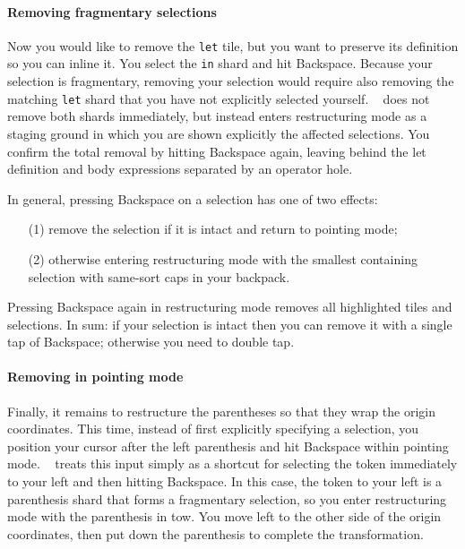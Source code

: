 \paragraph{Removing fragmentary selections}
Now you would like to remove the \texttt{let} tile,
but you want to preserve its definition so you
can inline it.
You select the \texttt{in} shard and hit Backspace.
Because your selection is fragmentary, removing
your selection would require also removing the
matching \texttt{let} shard that you have not
explicitly selected yourself.
\tylr~ does not remove both shards immediately, but
instead enters restructuring mode as a staging ground
in which you are shown explicitly the affected
selections.
You confirm the total removal by hitting Backspace again,
leaving behind the let definition and body expressions
separated by an operator hole.

In general, pressing Backspace on a selection
has one of two effects:
\begin{enumerate}
  \item[(1)] remove the selection if it is intact
    and return to pointing mode;
  \item[(2)] otherwise entering restructuring mode with
    the smallest containing selection with same-sort caps
    in your backpack.
\end{enumerate}
Pressing Backspace again in restructuring mode
removes all highlighted tiles and selections.
In sum: if your selection is intact then you can
remove it with a single tap of Backspace; otherwise
you need to double tap.



\paragraph{Removing in pointing mode}
Finally, it remains to restructure the parentheses
so that they wrap the origin coordinates.
This time, instead of first explicitly specifying a selection,
you position your cursor after the left parenthesis
and hit Backspace within pointing mode.
\tylr~ treats this input simply as a shortcut for selecting the
token immediately to your left and then hitting Backspace.
In this case, the token to your left is a parenthesis
shard that forms a fragmentary selection, so you
enter restructuring mode with the parenthesis in tow.
You move left to the other side of the origin coordinates,
then put down the parenthesis to complete the transformation.


